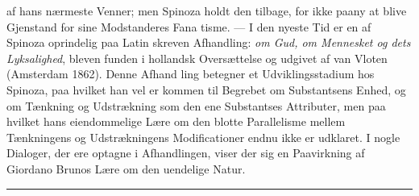 \documentclass[12pt,a4paper]{book}
\newcommand{\divrule}{\begin{center}\rule{2cm}{0.4pt}\end{center}}
\begin{document}
af hans nærmeste Venner; men Spinoza holdt den tilbage, for
ikke paany at blive Gjenstand for sine Modstanderes Fana\-%
tisme. --- I den nyeste Tid er en af Spinoza oprindelig paa
Latin skreven Afhandling: \emph{om Gud, om Mennesket og
dets Lyksalighed}, bleven funden i hollandsk Oversættelse
og udgivet af van Vloten (Amsterdam 1862). Denne Afhand\-%
ling betegner et Udviklingsstadium hos Spinoza, paa hvilket
han vel er kommen til Begrebet om Substantsens Enhed, og
om Tænkning og Udstrækning som den ene Substantses
Attributer, men paa hvilket hans eiendommelige Lære om den
blotte Parallelisme mellem Tænkningens og Udstrækningens
Modificationer endnu ikke er udklaret. I nogle Dialoger, der
ere optagne i Afhandlingen, viser der sig en Paavirkning af
Giordano Brunos Lære om den uendelige Natur.

\divrule
%
\end{document}
